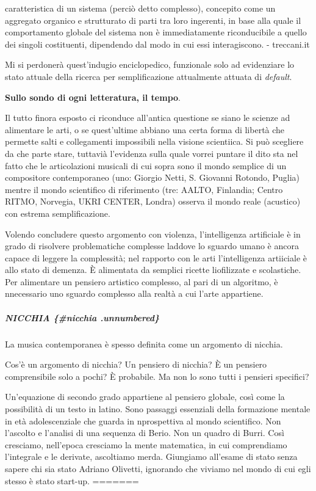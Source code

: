 \documentclass[a4paper,11pt]{article}
\begin{document}
caratteristica di un sistema (perciò detto complesso), concepito come un
aggregato organico e strutturato di parti tra loro ingerenti, in base
alla quale il comportamento globale del sistema non è immediatamente
riconducibile a quello dei singoli costituenti, dipendendo dal modo in
cui essi interagiscono. - treccani.it

Mi si perdonerà quest'indugio enciclopedico, funzionale solo ad
evidenziare lo stato attuale della ricerca per semplificazione
attualmente attuata di \emph{default}.

\textbf{Sullo sondo di ogni letteratura, il tempo}.

Il tutto finora esposto ci riconduce all'antica questione se siano le
scienze ad alimentare le arti, o se quest'ultime abbiano una certa forma
di libertà che permette salti e collegamenti impossibili nella visione
scientiica. Si può scegliere da che parte stare, tuttavià l'evidenza
sulla quale vorrei puntare il dito sta nel fatto che le articolazioni
musicali di cui sopra sono il mondo semplice di un compositore
contemporaneo (uno: Giorgio Netti, S. Giovanni Rotondo, Puglia) mentre
il mondo scientifico di riferimento (tre: AALTO, Finlandia; Centro
RITMO, Norvegia, UKRI CENTER, Londra) osserva il mondo reale (acustico)
con estrema semplificazione.

Volendo concludere questo argomento con violenza, l'intelligenza
artificiale è in grado di risolvere problematiche complesse laddove lo
sguardo umano è ancora capace di leggere la complessità; nel rapporto
con le arti l'intelligenza artiiciale è allo stato di demenza. È
alimentata da semplici ricette liofilizzate e scolastiche. Per
alimentare un pensiero artistico complesso, al pari di un algoritmo, è
nnecessario uno sguardo complesso alla realtà a cui l'arte appartiene.

\subparagraph{NICCHIA \{\#nicchia .unnumbered\}}\hypertarget{nicchia-nicchia-unnumbered}{}\label{nicchia-nicchia-unnumbered}

La musica contemporanea è spesso definita come un argomento di nicchia.

Cos'è un argomento di nicchia? Un pensiero di nicchia? È un pensiero
comprensibile solo a pochi? È probabile. Ma non lo sono tutti i pensieri
specifici?

Un'equazione di secondo grado appartiene al pensiero globale, così come
la possibilità di un testo in latino. Sono passaggi essenziali della
formazione mentale in età adolescenziale che guarda in nprospettiva al
mondo scientifico. Non l'ascolto e l'analisi di una sequenza di Berio.
Non un quadro di Burri. Così cresciamo, nell'epoca cresciamo la mente
matematica, in cui comprendiamo l'integrale e le derivate, ascoltiamo
merda. Giungiamo all'esame di stato senza sapere chi sia stato Adriano
Olivetti, ignorando che viviamo nel mondo di cui egli stesso è stato
start-up. =======
\end{document}
